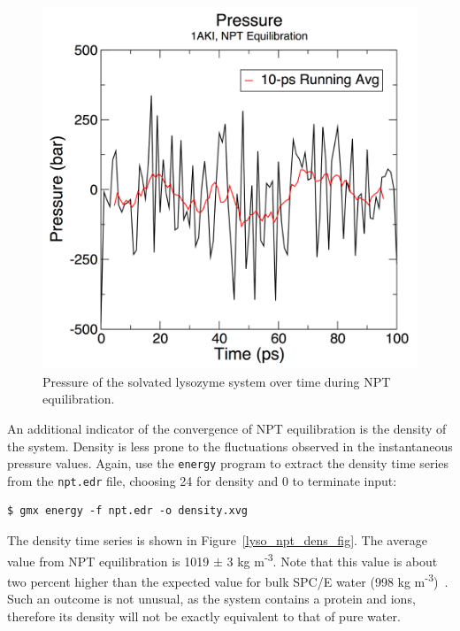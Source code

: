 \documentclass[9pt,tutorial,pubversion]{livecoms}
\begin{document}
\begin{figure}[h]
\centering
\includegraphics{plot_lyso_npt_pressure}
\caption{Pressure of the solvated lysozyme system over time during NPT equilibration.}
\label{lyso_npt_pres_fig}
\end{figure}

An additional indicator of the convergence of NPT equilibration is the density of the system. Density is less prone to the fluctuations observed in the instantaneous pressure values. Again, use the \texttt{energy} program to extract the density time series from the \texttt{npt.edr} file, choosing 24 for density and 0 to terminate input:

\begin{lstlisting}
$ gmx energy -f npt.edr -o density.xvg
\end{lstlisting}

The density time series is shown in Figure~\ref{lyso_npt_dens_fig}. The average value from NPT equilibration is 1019 $\pm$ 3 kg m\textsuperscript{-3}. Note that this value is about two percent higher than the expected value for bulk SPC/E water (998 kg m\textsuperscript{-3})~\cite{Berendsen1987}. Such an outcome is not unusual, as the system contains a protein and ions, therefore its density will not be exactly equivalent to that of pure water.
\end{document}
